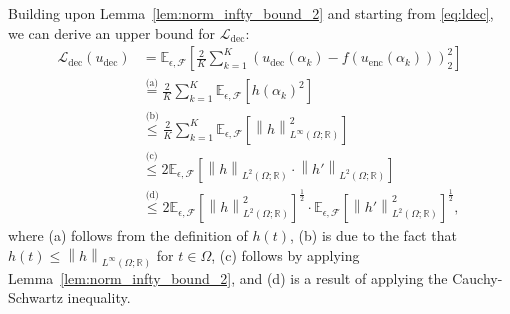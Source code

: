 \documentclass{article}
\newtheorem{lemma}{Lemma}
\def\encs{u_\textrm{enc}}
\def\decs{u_\textrm{dec}}
\def\ldec{\mathcal{L}_\textrm{dec}}
\def\stset{\mathcal{F}}
\newcommand{\norm}[1]{\left\lVert#1\right\rVert}
\newcommand{\lp}[1]{{L}^{#1}\left(\Omega; \mathbb{R}\right)}
\newcommand{\sob}[2]{\mathbb{W}^{#1,#2}\left(\Omega; \mathbb{R}\right)}
\newcommand{\lec}[2]{\stackrel{\text{#1}}{#2}}
\begin{document}
Building upon Lemma~\ref{lem:norm_infty_bound_2} and starting from \eqref{eq:ldec}, we can derive an upper bound for $\ldec$:
\begin{align}\label{eq:ldec_step3}
    \ldec(\decs) &= \mathbb{E}_{\epsilon, \stset} \left[\frac{2}{K} \sum^K_{k=1} \left(\decs(\alpha_k) -f(\encs(\alpha_k))\right)^2_2\right]
    \nonumber \\ 
    &\lec{(a)}{=} \frac{2}{K} \sum^K_{k=1} \mathbb{E}_{\epsilon, \stset} \left[h(\alpha_k)^2
    \right] 
    \nonumber \\
    &\lec{(b)}{\leqslant} \frac{2}{K} \sum^K_{k=1} \mathbb{E}_{\epsilon, \stset} \left[\norm{h}^2_{\lp{\infty}}
    \right] 
    \nonumber \\
    &\lec{(c)}{\leqslant} 2 \mathbb{E}_{\epsilon, \stset} \left[\norm{h}_{\lp{2}}\cdot \norm{h'}_{\lp{2}}
    \right]
    \nonumber \\
    &\lec{(d)}{\leqslant} 2 \mathbb{E}_{\epsilon, \stset} \left[\norm{h}^2_{\lp{2}}\right]^\frac{1}{2}\cdot \mathbb{E}_{\epsilon, \stset} \left[ \norm{h'}^2_{\lp{2}}
    \right]^\frac{1}{2},
\end{align}
where (a) follows from the definition of $h(t)$, (b) is due to the fact that $h(t) \leqslant \norm{h}_{\lp{\infty}}$ for $t \in \Omega$, (c) follows by applying Lemma~\ref{lem:norm_infty_bound_2}, and (d) is a result of applying the Cauchy-Schwartz inequality.
\end{document}
